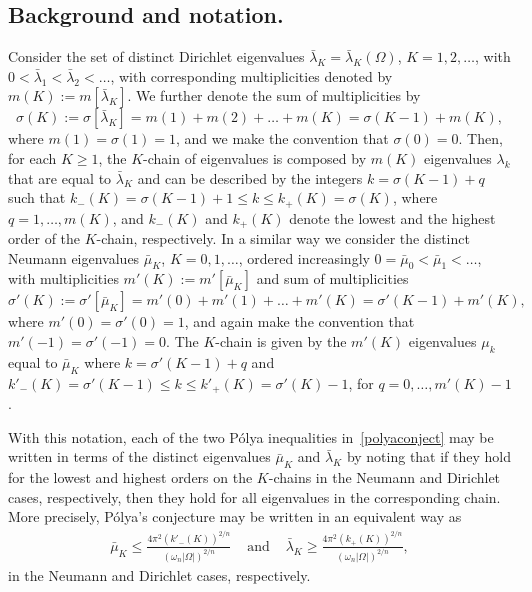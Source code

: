 \documentclass[11pt,a4paper,times]{amsart}
\theoremstyle{plain}
\theoremstyle{definition}
\numberwithin{equation}{section}
\newcommand{\ds}{\displaystyle}
\newcommand{\fr}[2]{\frac{\ds #1}{\ds #2}}
\newcommand{\txtg}{\textcolor{green}}
\begin{document}
{\subsection{Background and notation.}\label{Notations}
Consider the set of distinct Dirichlet eigenvalues $\bar{\lambda}_K=\bar{\lambda}_K(\Omega)$, $K=1,2, \ldots$, with
$0<\bar{\lambda}_1<\bar{\lambda}_2<\ldots$, with corresponding multiplicities denoted by $m(K):=m[\bar{\lambda}_K]$. We further denote
the sum of multiplicities by
\[\sigma(K):=\sigma[\bar{\lambda}_K] =m(1)+m(2)+\ldots+m(K)= \sigma(K-1)+m(K),\]
where $m(1)=\sigma(1)=1$,  and we make the convention that  $\sigma(0)=0$. Then, for each $K\geq 1$, the $K$-chain of eigenvalues is
composed by $m(K)$ eigenvalues $\lambda_k$ that are equal to $\bar{\lambda}_K$ and can be described by the integers $k=\sigma(K-1)+{q}$
such that $ k_-(K)=\sigma(K-1)+1\leq k \leq k_+(K)=\sigma(K)$, where $q=1,\ldots,m(K)$, and $k_-(K)$ and $k_+(K)$ denote the lowest and
the highest order of the $K$-chain,  respectively.
In a similar way we consider the distinct Neumann eigenvalues $\bar{\mu}_K$, $K=0,1, \ldots$, ordered increasingly
$0=\bar{\mu}_0<\bar{\mu}_1<\ldots$, with multiplicities $m'(K):=m'[\bar{\mu}_K]$ and sum of multiplicities
\[\sigma'(K):= \sigma'[\bar{\mu}_K]=m'(0)+ m'(1)+\ldots+m'(K)=\sigma'(K-1)+m'(K),\] where $m'(0)=\sigma'(0)=1$, and again
make the convention that $m'(-1)=\sigma'(-1)=0$. The $K$-chain is given by the $m'(K)$ eigenvalues $\mu_k$ equal to $\bar{\mu}_K$
where $k=\sigma'(K-1)+{q}$ and  $k'_-(K)=\sigma'(K-1)\leq k\leq k'_+(K)=\sigma'(K)-1$,  for ${q}=0,\ldots,m'(K)-1$.

With this notation, each of the two P\'{o}lya inequalities in~\eqref{polyaconject} may be written in terms of the distinct eigenvalues
$\bar{\mu}_K$ and $\bar{\lambda}_K$ by noting that if they hold for the lowest and highest orders on the $K$-chains in the Neumann
and Dirichlet cases, respectively, then they hold for all eigenvalues in the corresponding chain. More precisely, P\'{o}lya's conjecture
may be written in an equivalent way as
\begin{equation}\label{PolyaExtreme}
\begin{array}{lll}
 	\bar{\mu}_K \leq \fr{4\pi^2 (k'_-(K))^{2/n}}{(\omega_n|\Omega|)^{2/n}} & \mbox { and } &
 	\bar{\lambda}_K \geq \fr{4\pi^2 (k_+(K))^{2/n}}{(\omega_n|\Omega|)^{2/n}},
\end{array}
 \end{equation}
in the Neumann and Dirichlet cases, respectively.

}
\end{document}
